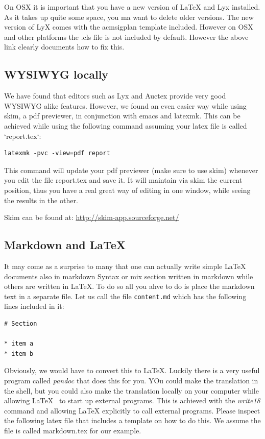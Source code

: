 On OSX it is important that you have a new version of LaTeX and Lyx
installed. As it takes up quite some space, you ma want to delete older
versions. The new version of LyX comes with the acmsigplan template
included. However on OSX and other platforms the .cls file is not
included by default. However the above link clearly documents how to fix
this.

\subsection{WYSIWYG locally}\label{wysiwyg-locally}

We have found that editors such as Lyx and Auctex provide very good
WYSIWYG alike features. However, we found an even easier way while using
skim, a pdf previewer, in conjunction with emacs and latexmk. This can
be achieved while using the following command assuming your latex file
is called `report.tex`:

\begin{verbatim}
latexmk -pvc -view=pdf report
\end{verbatim}

This command will update your pdf previewer (make sure to use skim)
whenever you edit the file report.tex and save it. It will maintain via
skim the current position, thus you have a real great way of editing in
one window, while seeing the results in the other.

Skim can be found at: \url{http://skim-app.sourceforge.net/}

\subsection{Markdown and \LaTeX}

It may come as a surprise to many that one can actually write simple
LaTeX documents also in markdown Syntax or mix section written in
markdown while others are written in LaTeX. To do so all you ahve to
do is place the markdown text in a separate file. Let us call the file 
\verb|content.md| which has the following lines included in it:

\begin{verbatim}
# Section

* item a
* item b
\end{verbatim}

Obviously, we would have to convert this to LaTeX. Luckily there is a
very useful program called {\em pandoc} that does this for you. YOu
could make the translation in the shell, but you could also make the
translation locally on your computer while allowing \LaTeX~ to start up
external programs. This is achieved with the {\em write18} command and
allowing LaTeX explicitly to call external programs. Please inspect
the following latex file that includes a template on how to do
this. We assume the file is called markdown.tex for our example.

